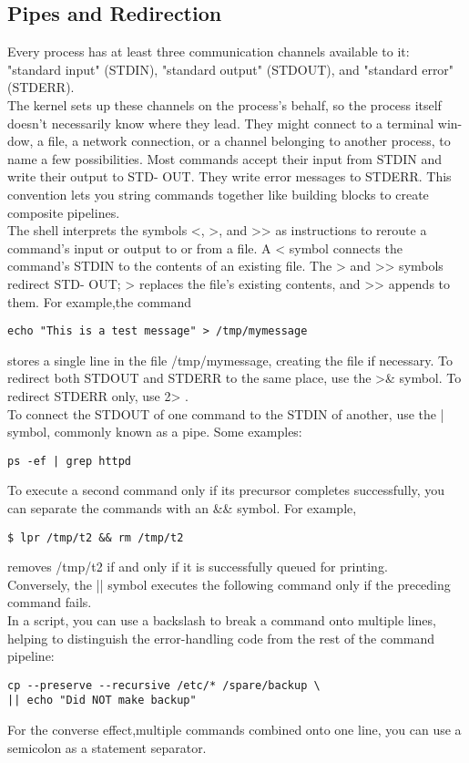 \documentclass[10pt,letterpaper]{book}
\begin{document}
\subsection{Pipes and Redirection}
Every process has at least three communication channels available to it: "standard input" (STDIN), "standard output" (STDOUT), and "standard error" (STDERR).\\
The kernel sets up these channels on the process's behalf, so the process itself
doesn't necessarily know where they lead. They might connect to a terminal win-
dow, a file, a network connection, or a channel belonging to another process, to
name a few possibilities.
Most commands accept their input from STDIN and write their output to STD-
OUT. They write error messages to STDERR. This convention lets you string
commands together like building blocks to create composite pipelines.\\
The shell interprets the symbols <, >, and >> as instructions to reroute a command's input or output to or from a file. A < symbol connects the command's
STDIN to the contents of an existing file. The > and >> symbols redirect STD-
OUT; > replaces the file's existing contents, and >> appends to them. For example,the command
\begin{lstlisting}
echo "This is a test message" > /tmp/mymessage
\end{lstlisting}
stores a single line in the file /tmp/mymessage, creating the file if necessary.
To redirect both STDOUT and STDERR to the same place, use the >\& symbol. To redirect STDERR only, use 2> .\\
To connect the STDOUT of one command to the STDIN of another, use the | symbol, commonly known as a pipe. Some examples:
\begin{lstlisting}
ps -ef | grep httpd
\end{lstlisting}
To execute a second command only if its precursor completes successfully, you can separate the commands with an \&\& symbol. For example,
\begin{lstlisting}
$ lpr /tmp/t2 && rm /tmp/t2
\end{lstlisting}
removes /tmp/t2 if and only if it is successfully queued for printing.\\
Conversely, the || symbol executes the following command only if the preceding
command fails.\\
In a script, you can use a backslash to break a command onto multiple lines, helping to distinguish the error-handling code from the rest of the command pipeline:
\begin{lstlisting}
cp --preserve --recursive /etc/* /spare/backup \
|| echo "Did NOT make backup"
\end{lstlisting}
For the converse effect,multiple commands combined onto one line, you can
use a semicolon as a statement separator.
\end{document}
